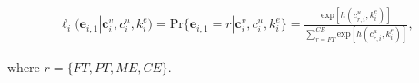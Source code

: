 \documentclass[12pt, a4paper]{article}
\begin{document}
\begin{align}\label{eq:prob_init_state}
\ell_{i}(\textbf{e}_{i,1}|\textbf{c}_i^v,c_i^u,k_i^e) = \text{Pr}\{\textbf{e}_{i,1}=r|\textbf{c}_i^v,c_i^u,k_i^e\} =\frac{\text{exp}[h(c_{r,i}^{u},k_i^e)]}{\sum\limits_{r=FT}^{CE}\text{exp}[h(c_{r,i}^{u},k_i^e)]},
\end{align}

where $r=\{FT,PT,ME,CE\}$.




\end{document}
